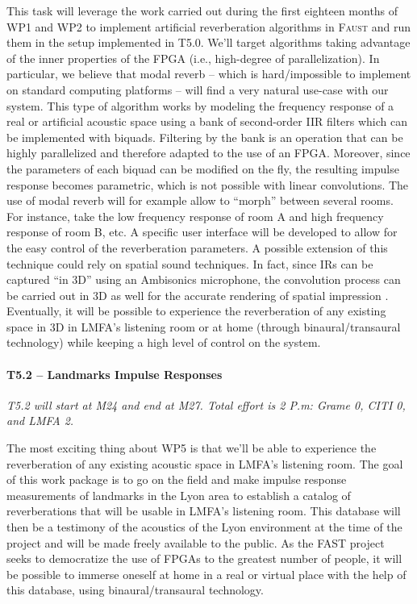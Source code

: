 \documentclass[a4paper,9pt]{extarticle}
\newcommand{\F}{\textsc{Faust}}
\newcommand{\PP}{FAST}
\begin{document}
This task will leverage the work carried out during the first eighteen months of WP1 and WP2 to implement artificial reverberation algorithms in \F{} and run them in the setup implemented in T5.0. We'll target algorithms taking advantage of the inner properties of the FPGA (i.e., high-degree of parallelization). In particular, we believe that modal reverb \cite{Abel2019} -- which is hard/impossible to implement on standard computing platforms -- will find a very natural use-case with our system. This type of algorithm works by modeling the frequency response of a real or artificial acoustic space using a bank of second-order IIR filters which can be implemented with biquads. Filtering by the bank is an operation that can be highly parallelized and therefore adapted to the use of an FPGA. Moreover, since the parameters of each biquad can be modified on the fly, the resulting impulse response becomes parametric, which is not possible with linear convolutions. The use of modal reverb will for example allow to ``morph'' between several rooms. For instance, take the low frequency response of room A and high frequency response of room B, etc. A specific user interface will be developed to allow for the easy control of the reverberation parameters.
A possible extension of this technique could rely on spatial sound techniques. In fact, since IRs can be captured ``in 3D'' using an Ambisonics microphone, the convolution process can be carried out in 3D as well for the accurate rendering of spatial impression \cite{merimaa2005spatial}. Eventually, it will be possible to experience the reverberation of any existing space in 3D in LMFA's listening room or at home (through binaural/transaural technology) while keeping a high level of control on the system. 

\paragraph{T5.2 -- Landmarks Impulse Responses}

\textit{T5.2 will start at M24 and end at M27. Total effort is 2 P.m: Grame 0, CITI 0, and LMFA 2.}

The most exciting thing about WP5 is that we'll be able to experience the reverberation of any existing acoustic space in LMFA's listening room. The goal of this work package is to go on the field and make impulse response measurements of landmarks in the Lyon area to establish a catalog of reverberations that will be usable in LMFA's listening room. This database will then be a testimony of the acoustics of the Lyon environment at the time of the project and will be made freely available to the public. As the \PP{} project seeks to democratize the use of FPGAs to the greatest number of people, it will be possible to immerse oneself at home in a real or virtual place with the help of this database, using binaural/transaural technology.
\end{document}
